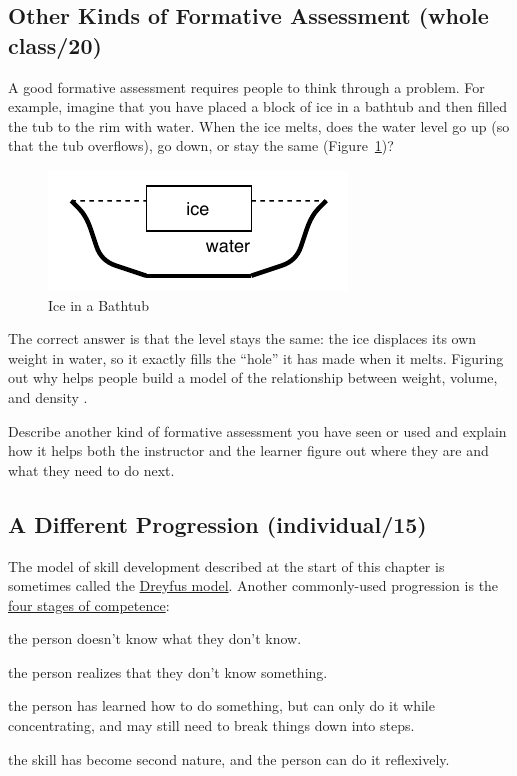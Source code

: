 \subsection{Other Kinds of Formative Assessment (whole class/20)}\label{other-kinds-of-formative-assessment-whole-class20}

A good formative assessment requires people to think through a problem.
For example, imagine that you have placed a block of ice in a bathtub
and then filled the tub to the rim with water. When the ice melts, does
the water level go up (so that the tub overflows), go down, or stay the
same (Figure~\ref{f:models-bathtub})?

\begin{figure}
\centering
\includegraphics{../../figures/bathtub.pdf}
\caption{Ice in a Bathtub}
\label{f:models-bathtub}
\end{figure}

The correct answer is that the level stays the same: the ice displaces
its own weight in water, so it exactly fills the ``hole'' it has made when
it melts. Figuring out why helps people build a model of the
relationship between weight, volume, and density \cite{Epst2002}.

Describe another kind of formative assessment you have seen or used and
explain how it helps both the instructor and the learner figure out
where they are and what they need to do next.

\subsection{A Different Progression (individual/15)}\label{a-different-progression-individual15}

The model of skill development described at the start of this chapter
is sometimes called the \href{https://en.wikipedia.org/wiki/Dreyfus_model_of_skill_acquisition}{Dreyfus model}. Another
commonly-used progression is the \href{https://en.wikipedia.org/wiki/Four_stages_of_competence}{four stages of
competence}:

\begin{description}
\tightlist
\item[Unconscious incompetence:]
the person doesn't know what they don't know.
\item[Conscious incompetence:]
the person realizes that they don't know something.
\item[Conscious competence:]
the person has learned how to do something, but can only do it while
concentrating, and may still need to break things down into steps.
\item[Unconscious competence:]
the skill has become second nature, and the person can do it
reflexively.
\end{description}

